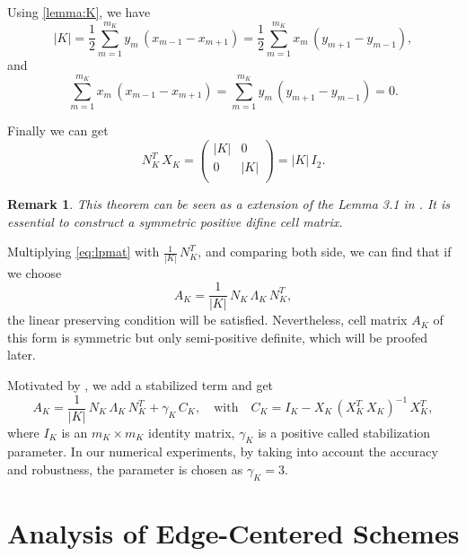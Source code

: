 \documentclass[times,review,preprint,authoryear]{elsarticle}
\newtheorem{remark}{Remark}
\begin{document}
Using \cref{lemma:K}, we have
\begin{equation*}
|K| = \frac12 \sum_{m=1}^{m_K} y_{m} \, (x_{m-1} - x_{m+1}) = \frac12 \sum_{m=1}^{m_K} x_{m} \, (y_{m+1} - y_{m-1}),
\end{equation*}
and
\begin{equation*}
\sum_{m=1}^{m_K} x_{m} \, (x_{m-1} - x_{m+1}) = \sum_{m=1}^{m_K} y_{m} \, (y_{m+1} - y_{m-1}) = 0.
\end{equation*}

Finally we can get
\begin{equation*}
N_K^T \, X_K = \left(\begin{matrix}
|K| & 0 \\
0 & |K| \\
\end{matrix}\right)
= |K| \, I_2.
\end{equation*}

\begin{remark}
This theorem can be seen as a extension of the Lemma 3.1 in \cite{wu_vertex-centered_2016}. It is essential to construct a symmetric positive difine cell matrix.
\end{remark}

Multiplying \cref{eq:lpmat} with $\frac{1}{|K|} \, N_K^T$, and comparing both side, we can find that if we choose
\begin{equation*}
A_K = \frac{1}{|K|} \, N_K \, \Lambda_{K} \, N_K^T,
\end{equation*}
the linear preserving condition will be satisfied. Nevertheless, cell matrix $A_K$ of this form is symmetric but only semi-positive definite, which will be proofed later.

Motivated by \cite{dong_analysis_2020}, we add a stabilized term and get
\begin{equation*}
A_K = \frac{1}{|K|} \, N_K \, \Lambda_{K} \, N_K^T + \gamma_K \, C_K, \quad \text{with} \quad C_K = I_K - X_K \, (X_K^T \, X_K)^{-1} \, X_K^T,
\end{equation*}
where  $I_K$ is an $m_K \times m_K$ identity matrix, $\gamma_K$ is a positive called stabilization parameter. In our numerical experiments, by taking into account the accuracy and robustness, the parameter is chosen as $\gamma_K = 3$.

\section{Analysis of Edge-Centered Schemes}\label{sec4}
\end{document}

